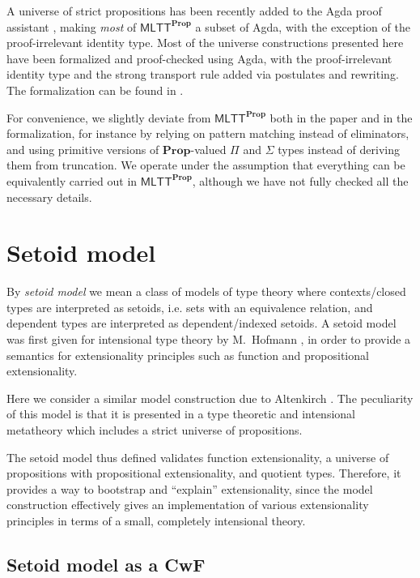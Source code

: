\documentclass[autoref]{llncs}
\newcommand{\mlttp}{\textsf{MLTT}^{\mProp}}
\newcommand{\mProp}{\mathbf{Prop}}
\begin{document}
A universe of strict propositions has been recently added to the Agda proof
assistant \cite{agda-prop}, making \emph{most} of $\mlttp$ a subset of Agda,
with the exception of the proof-irrelevant identity type. Most of the universe
constructions presented here have been formalized and proof-checked using Agda,
with the proof-irrelevant identity type and the strong transport rule added via
postulates and rewriting. The formalization can be found in \cite{agda-code}.

For convenience, we slightly deviate from $\mlttp$ both in the paper and in the
formalization, for instance by relying on pattern matching instead of
eliminators, and using primitive versions of $\mProp$-valued $\Pi$ and $\Sigma$
types instead of deriving them from truncation. We operate under the assumption
that everything can be equivalently carried out in $\mlttp$, although we have not
fully checked all the necessary details.

\section{Setoid model}\label{sec:setoid-model}

By \emph{setoid model} we mean a class of models of type theory where
contexts/closed types are interpreted as setoids, i.e. sets with an equivalence
relation, and dependent types are interpreted as dependent/indexed setoids.
%
A setoid model was first given for intensional type theory by M.\ Hofmann
\cite{hofmann}, in order to provide a semantics for extensionality principles such
as function and propositional extensionality.

Here we consider a similar model construction due to Altenkirch
\cite{setoid99}. The peculiarity of this model is that it is presented in a type
theoretic and intensional metatheory which includes a strict universe of
propositions.

The setoid model thus defined validates function extensionality, a universe of
propositions with propositional extensionality, and quotient types. Therefore,
it provides a way to bootstrap and ``explain'' extensionality, since the model
construction effectively gives an implementation of various extensionality
principles in terms of a small, completely intensional theory.

\subsection{Setoid model as a CwF}
\end{document}
